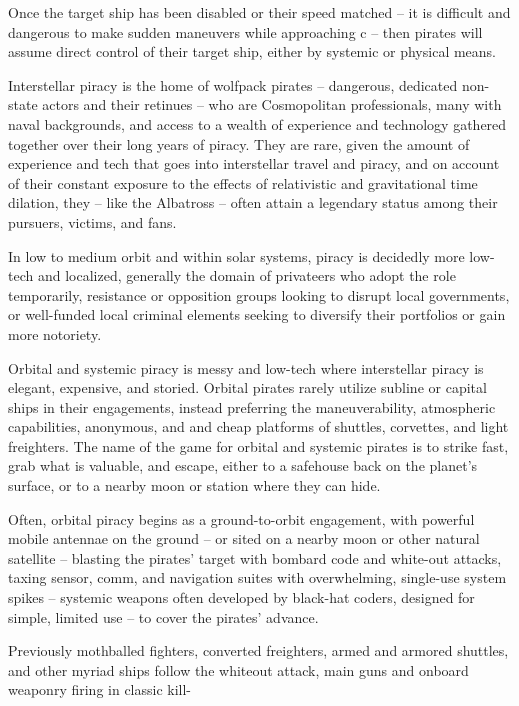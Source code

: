Once the target ship has been disabled or their speed matched -- it is difficult and dangerous to  
make sudden maneuvers while approaching c -- then pirates will assume direct control of their  
target ship, either by systemic or physical means.   

Interstellar piracy is the home of wolfpack pirates -- dangerous, dedicated non-state actors and  
their retinues -- who are Cosmopolitan professionals, many with naval backgrounds, and access  
to a wealth of experience and technology gathered together over their long years of piracy. They  
are rare, given the amount of experience and tech that goes into interstellar travel and piracy, and  
on account of their constant exposure to the effects of relativistic and gravitational time dilation,  
they  -- like the Albatross -- often attain a legendary status among their pursuers, victims, and  
fans.   

In low to medium orbit and within solar systems, piracy is decidedly more low-tech and localized,  
generally the domain of privateers who adopt the role temporarily, resistance or opposition groups  
looking to disrupt local governments, or well-funded local criminal elements seeking to diversify  
their portfolios or gain more notoriety.   

Orbital and systemic piracy is messy and low-tech where interstellar piracy is elegant, expensive,  
and storied. Orbital pirates rarely utilize subline or capital ships in their engagements, instead  
preferring the maneuverability, atmospheric capabilities, anonymous, and and cheap platforms of  
shuttles, corvettes, and light freighters. The name of the game for orbital and systemic pirates is  
to strike fast, grab what is valuable, and escape, either to a safehouse back on the planet’s  
surface, or to a nearby moon or station where they can hide.   

Often, orbital piracy begins as a ground-to-orbit engagement, with powerful mobile antennae on  
the ground -- or sited on a nearby moon or other natural satellite -- blasting the pirates’ target with  
bombard code and white-out attacks, taxing sensor, comm, and navigation suites with  
overwhelming, single-use system spikes -- systemic weapons often developed by black-hat  
coders, designed for simple, limited use -- to cover the pirates’ advance.   

Previously mothballed fighters, converted freighters, armed and armored shuttles, and other  
myriad ships follow the whiteout attack, main guns and onboard weaponry firing in classic kill- 

